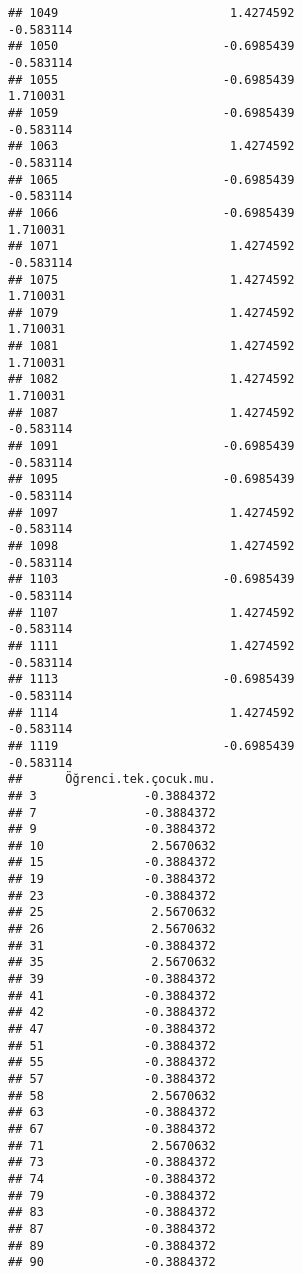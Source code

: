 \documentclass[
]{article}
\begin{document}
\begin{verbatim}
## 1049                        1.4274592                        -0.583114
## 1050                       -0.6985439                        -0.583114
## 1055                       -0.6985439                         1.710031
## 1059                       -0.6985439                        -0.583114
## 1063                        1.4274592                        -0.583114
## 1065                       -0.6985439                        -0.583114
## 1066                       -0.6985439                         1.710031
## 1071                        1.4274592                        -0.583114
## 1075                        1.4274592                         1.710031
## 1079                        1.4274592                         1.710031
## 1081                        1.4274592                         1.710031
## 1082                        1.4274592                         1.710031
## 1087                        1.4274592                        -0.583114
## 1091                       -0.6985439                        -0.583114
## 1095                       -0.6985439                        -0.583114
## 1097                        1.4274592                        -0.583114
## 1098                        1.4274592                        -0.583114
## 1103                       -0.6985439                        -0.583114
## 1107                        1.4274592                        -0.583114
## 1111                        1.4274592                        -0.583114
## 1113                       -0.6985439                        -0.583114
## 1114                        1.4274592                        -0.583114
## 1119                       -0.6985439                        -0.583114
##      Öğrenci.tek.çocuk.mu.
## 3               -0.3884372
## 7               -0.3884372
## 9               -0.3884372
## 10               2.5670632
## 15              -0.3884372
## 19              -0.3884372
## 23              -0.3884372
## 25               2.5670632
## 26               2.5670632
## 31              -0.3884372
## 35               2.5670632
## 39              -0.3884372
## 41              -0.3884372
## 42              -0.3884372
## 47              -0.3884372
## 51              -0.3884372
## 55              -0.3884372
## 57              -0.3884372
## 58               2.5670632
## 63              -0.3884372
## 67              -0.3884372
## 71               2.5670632
## 73              -0.3884372
## 74              -0.3884372
## 79              -0.3884372
## 83              -0.3884372
## 87              -0.3884372
## 89              -0.3884372
## 90              -0.3884372

\end{verbatim}
\end{document}
